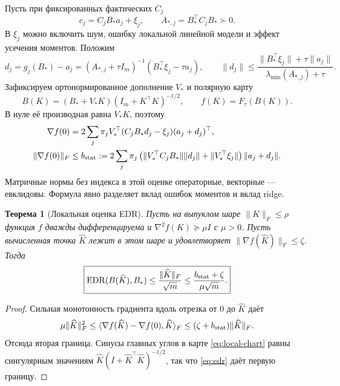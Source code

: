 \documentclass[11pt,a4paper]{article}
\newcommand{\EDR}{\operatorname{EDR}}
\newcommand{\norm}[1]{\lVert#1\rVert}
\newcommand{\inner}[2]{\langle#1,#2\rangle_F}
\newtheorem{theorem}{Теорема}[section]
\theoremstyle{remark}
\begin{document}
Пусть при фиксированных фактических $C_j$
\begin{equation}\label{eq:perturb}
 c_j=C_jB_*a_j+\xi_j,\qquad
 A_{*,j}=B_*^\top C_jB_*\succ0.
\end{equation}
В $\xi_j$ можно включить шум, ошибку локальной линейной модели и
эффект усечения моментов. Положим
\begin{equation}\label{eq:coefficient-bias}
 d_j=g_j(B_*)-a_j
 =(A_{*,j}+\tau I_m)^{-1}(B_*^\top\xi_j-\tau a_j),
 \qquad
 \norm{d_j}\le
 \frac{\norm{B_*^\top\xi_j}+\tau\norm{a_j}}
 {\lambda_{\min}(A_{*,j})+\tau}.
\end{equation}
Зафиксируем ортонормированное дополнение $V_*$ и полярную карту
\begin{equation}\label{eq:local-chart}
 B(K)=(B_*+V_*K)(I_m+K^\top K)^{-1/2},\qquad
 f(K)=F_\tau(B(K)).
\end{equation}
В нуле её производная равна $V_*K$, поэтому
\begin{align}\label{eq:score-bound}
 \nabla f(0)&=2\sum_j\pi_jV_*^\top(C_jB_*d_j-\xi_j)(a_j+d_j)^\top,
 \nonumber\\
 \norm{\nabla f(0)}_F&\le b_{\rm stat}:=
 2\sum_j\pi_j
 \left(\norm{V_*^\top C_jB_*}\norm{d_j}
       +\norm{V_*^\top\xi_j}\right)\norm{a_j+d_j}.
\end{align}
Матричные нормы без индекса в этой оценке операторные, векторные ---
евклидовы. Формула явно разделяет вклад ошибок моментов и вклад ridge.

\begin{theorem}[Локальная оценка EDR]\label{th:edr-bound}
Пусть на выпуклом шаре $\norm{K}_F\le\rho$ функция $f$ дважды
дифференцируема и $\nabla^2 f(K)\succeq\mu I$ с $\mu>0$.
Пусть вычисленная точка $\widehat K$ лежит в этом шаре и удовлетворяет
$\norm{\nabla f(\widehat K)}_F\le\zeta$. Тогда
\begin{equation}\label{eq:edr-bound}
 \boxed{\displaystyle
 \EDR(B(\widehat K),B_*)
 \le\frac{\norm{\widehat K}_F}{\sqrt m}
 \le\frac{b_{\rm stat}+\zeta}{\mu\sqrt m}.}
\end{equation}
\end{theorem}
\begin{proof}
Сильная монотонность градиента вдоль отрезка от $0$ до $\widehat K$ даёт
\[
 \mu\norm{\widehat K}_F^2\le
 \inner{\nabla f(\widehat K)-\nabla f(0)}{\widehat K}
 \le(\zeta+b_{\rm stat})\norm{\widehat K}_F.
\]
Отсюда вторая граница. Синусы главных углов в карте
\eqref{eq:local-chart} равны сингулярным значениям
$\widehat K(I+\widehat K^\top\widehat K)^{-1/2}$, так что
\eqref{eq:edr} даёт первую границу.
\end{proof}
\end{document}
